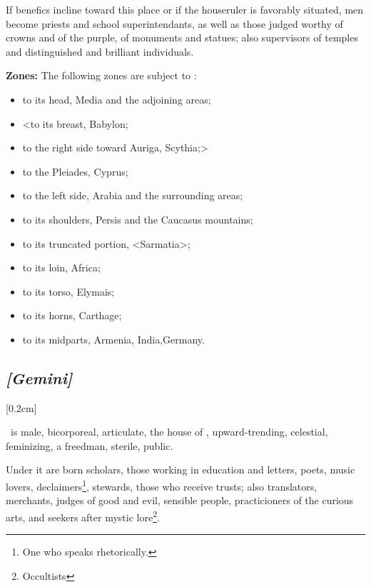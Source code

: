 If benefics incline toward this place or if the houseruler is favorably situated, men become priests and school superintendants, as well as those judged worthy of crowns and of the purple, of monuments and statues; also supervisors of temples and distinguished and brilliant individuals.

\textbf{Zones:} The following zones are subject to \Taurus: 
\begin{itemize}
\item to its head, Media and the adjoining areas; 
\item <to its breast, Babylon; 
\item to the right side toward Auriga, Scythia;> 
\item to the Pleiades, Cyprus; 
\item to the left side, Arabia and the surrounding areas; 
\item to its shoulders, Persis and the Caucasus mountains; 
\item to its truncated portion, <Sarmatia>; 
\item to its loin, Africa; 
\item to its torso, Elymais; 
\item to its horns, Carthage; 
\item to its midparts, Armenia, India,Germany.
\end{itemize}

\secbr
\subsection{\textit{[Gemini]}}
[0.2cm]

 \Gemini\, is  male,  bicorporeal, articulate, the house of \Mercury, upward-trending, celestial, feminizing, a freedman,  sterile, public. 

Under it are born scholars, those working in education and letters, poets, music lovers, declaimers\footnote{One who speaks rhetorically.}, stewards, those who receive trusts; also translators, merchants, judges of good and evil, sensible people, practicioners of the curious arts, and seekers after mystic lore\footnote{Occultists}. 

